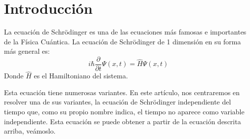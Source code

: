 \documentclass{article}
\begin{document}
	\section{Introducción}
	La ecuación de Schrödinger es una de las ecuaciones más famosas
	e importantes de la Física Cuántica. La ecuación de Schrödinger de 1
	dimensión en su forma más general es: 
	\begin{equation}
		i\hbar \frac{\partial}{\partial t}\Psi (x,t)=\hat{H} \Psi (x,t)
	\end{equation}
	Donde $\hat{H}$ es el Hamiltoniano del sistema. \\
	\par
	Esta ecuación tiene numerosas variantes. En este artículo, nos 
	centraremos en resolver una de sus variantes, la ecuación de Schrödinger
	independiente del tiempo que, como su propio nombre indica, el tiempo
	no aparece como variable independiente. Esta ecuación se puede obtener a partir de la ecuación descrita arriba, veámoslo.
	
	
\end{document}
